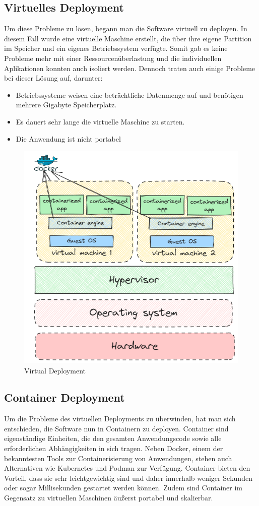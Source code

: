 \cite{Traditional_vs_Container_vs_Virtuell_Deployment}


\subsection{Virtuelles Deployment}
Um diese Probleme zu lösen, begann man die Software virtuell zu deployen. In diesem Fall wurde eine virtuelle Maschine erstellt, die über ihre eigene Partition im Speicher und ein eigenes Betriebssystem verfügte. Somit gab es keine Probleme mehr mit einer Ressourcenüberlastung und die individuellen Aplikationen konnten auch isoliert werden. Dennoch traten auch einige Probleme bei dieser Lösung auf, darunter:

\begin{itemize}
\item Betriebssysteme weisen eine beträchtliche Datenmenge auf und benötigen mehrere Gigabyte Speicherplatz.
\item Es dauert sehr lange die virtuelle Maschine zu starten.
\item  Die Anwendung ist nicht portabel
\end{itemize}

\begin{figure}[h!]
    \centering
    \includegraphics[width=0.7\linewidth]{pics/virtual-deployment.png}
    \caption{Virtual Deployment}
    \label{fig:enter-label}
\end{figure}

\cite{Virtuelles_Deployment}

\subsection{Container Deployment}
Um die Probleme des virtuellen Deployments zu überwinden, hat man sich entschieden, die Software nun in Containern zu deployen. Container sind eigenständige Einheiten, die den gesamten Anwendungscode sowie alle erforderlichen Abhängigkeiten in sich tragen. Neben Docker, einem der bekanntesten Tools zur Containerisierung von Anwendungen, stehen auch Alternativen wie Kubernetes und Podman zur Verfügung. Container bieten den Vorteil, dass sie sehr leichtgewichtig sind und daher innerhalb weniger Sekunden oder sogar Millisekunden gestartet werden können. Zudem sind Container im Gegensatz zu virtuellen Maschinen äußerst portabel und skalierbar.



